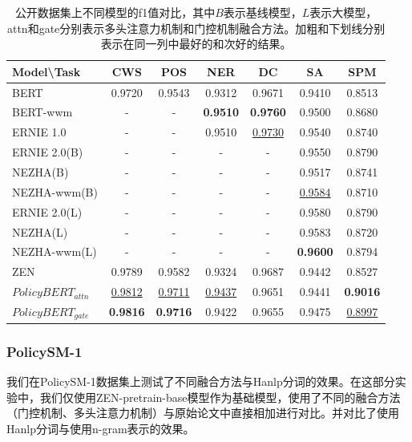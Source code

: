 \documentclass[12pt, a4paper]{ctexart}
\begin{document}
\begin{table}[H]
    \renewcommand{\arraystretch}{0.8}
    \centering
    \caption{公开数据集上不同模型的f1值对比，其中$B$表示基线模型，$L$表示大模型，attn和gate分别表示多头注意力机制和门控机制融合方法。加粗和下划线分别表示在同一列中最好的和次好的结果。}
    \begin{tabular}{lcccccc}
        \toprule
        \textbf{Model\textbackslash Task} & CWS & POS & NER & DC & SA & SPM \\
        \midrule
        BERT      & 0.9720 & 0.9543 & 0.9312 & 0.9671 & 0.9410 & 0.8513\\
        \midrule
        BERT-wwm     & - & - & \textbf{0.9510} & \textbf{0.9760} & 0.9500 & 0.8680\\
        ERNIE 1.0    & - & - & 0.9510 & \underline{0.9730} & 0.9540 & 0.8740 \\
        ERNIE 2.0(B) & - & - & -      & -      & 0.9550 & 0.8790\\
        NEZHA(B)     & - & - & -      & -      & 0.9517 & 0.8741\\
        NEZHA-wwm(B) & - & - & -      & -      & \underline{0.9584} & 0.8710\\
        \midrule
        ERNIE 2.0(L) & - & - & -      & -      & 0.9580 & 0.8790\\
        NEZHA(L)     & - & - & -      & -      & 0.9583 & 0.8720\\
        NEZHA-wwm(L) & - & - & -      & -      & \textbf{0.9600} & 0.8794\\
        \midrule
        ZEN       & 0.9789 & 0.9582 & 0.9324 & 0.9687 & 0.9442 & 0.8527\\
        \midrule
        $PolicyBERT_{attn}$ & \underline{0.9812} & \underline{0.9711} & \underline{0.9437} & 0.9651 & 0.9441 & \textbf{0.9016}\\
        $PolicyBERT_{gate}$ & \textbf{0.9816} & \textbf{0.9716} & 0.9422 & 0.9655 & 0.9475 & \underline{0.8997}\\ 
        \bottomrule
    \end{tabular}
    \label{tab:public_results} 
\end{table}

\subsubsection{PolicySM-1}
我们在PolicySM-1数据集上测试了不同融合方法与Hanlp分词的效果。在这部分实验中，我们仅使用ZEN-pretrain-base模型作为基础模型，使用了不同的融合方法（门控机制、多头注意力机制）与原始论文中直接相加进行对比。并对比了使用Hanlp分词与使用n-gram表示的效果。
\end{document}
